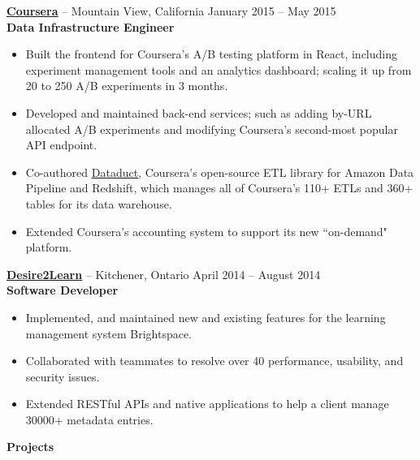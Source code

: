 \documentclass{letter}
\begin{document}
\vspace{-1.5mm}
{\bfseries \href{https://www.coursera.org}{\uline{Coursera}}} -- Mountain View, California \hfill January 2015 -- May 2015 \\
{\bfseries Data Infrastructure Engineer}
\vspace{-3mm}
\begin{itemize}
    \item Built the frontend for Coursera's A/B testing platform in React, including
      experiment management tools and an analytics dashboard; scaling it up from 20 to
      250 A/B experiments in 3 months.
    \item Developed and maintained back-end services; such as adding by-URL allocated
      A/B experiments and modifying Coursera's second-most popular API endpoint.
    \item Co-authored \href{https://github.com/coursera/dataduct}{\uline{Dataduct}},
      Coursera's open-source ETL library for Amazon Data Pipeline and
      Redshift, which manages all of Coursera's 110+ ETLs and 360+ tables for its data warehouse.
    \item Extended Coursera's accounting system to support its new ``on-demand" platform.
\end{itemize}

\vspace{-1.5mm}
{\bfseries \href{http://www.d2l.com}{\uline{Desire2Learn}}} -- Kitchener, Ontario \hfill April 2014 -- August 2014 \\
{\bfseries Software Developer}
\vspace{-3mm}
\begin{itemize}
    \item Implemented, and maintained new and existing features for the learning
      management system Brightspace.
    \item Collaborated with teammates to resolve over 40 performance, usability, and security issues.
    \item Extended RESTful APIs and native applications to help a client manage 30000+ metadata entries.
\end{itemize}

{\bfseries \Large Projects}
\end{document}
